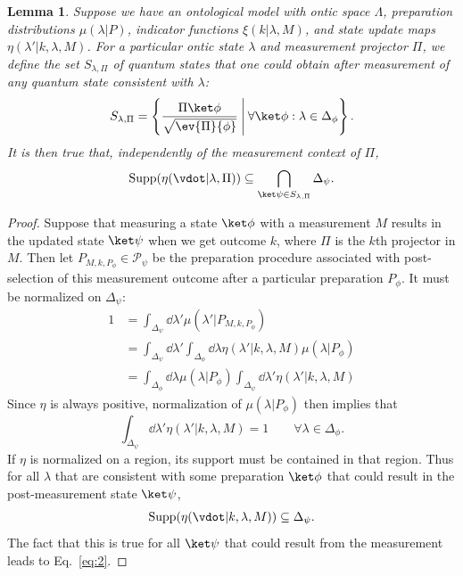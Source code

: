 \documentclass[%
 reprint,
superscriptaddress,
nofootinbib,
 amsmath,amssymb,
 prx, 
 accepted=2019-09-27,
]{quantumarticle}
\newtheorem{lemma}{Lemma}
\newcommand{\supp}{\textup{Supp}}
\begin{document}
\begin{lemma}
  \label{lem:littlelemma}
  Suppose we have an ontological model with ontic space $\Lambda$,
  preparation distributions $\mu(\lambda|P)$, indicator functions
  $\xi(k|\lambda,M)$, and state update maps
  $\eta(\lambda'|k,\lambda,M)$. For a particular ontic state $\lambda$
  and measurement projector $\Pi$, we define the set $S_{\lambda,\Pi}$
  of quantum states that one could obtain after measurement of any
  quantum state consistent with $\lambda$:
  \begin{equation}
    \label{eq:32}
    S_{\lambda,\Pi}=\left\{\frac{\Pi\ket\phi}{\sqrt{\ev{\Pi}{\phi}}}\:\middle|\:\forall\ket\phi:\lambda\in\Delta_\phi\right\}.
  \end{equation}
  It is then true that, independently of the measurement context of
  $\Pi$,
  \begin{equation}
    \label{eq:2}
    \supp(\eta(\vdot|\lambda,\Pi)) \subseteq \bigcap_{\ket\psi\in S_{\lambda,\Pi}}\Delta_\psi.
  \end{equation}
\end{lemma}
\begin{proof}
  Suppose that measuring a state $\ket\phi$ with a measurement $M$
  results in the updated state $\ket\psi$ when we get outcome $k$,
  where $\Pi$ is the $k$th projector in $M$. Then let
  $P_{M,k,P_\phi}\in\mathcal P_\psi$ be the preparation procedure
  associated with post-selection of this measurement outcome after a
  particular preparation $P_\phi$. It must be normalized on
  $\Delta_\psi$:
  \begin{align}
    1 &= \int_{\Delta_\psi}\dd{\lambda'}\mu(\lambda'|P_{M,k,P_\phi})\nonumber\\
      &= \int_{\Delta_\psi}\dd{\lambda'}\int_{\Delta_\phi}\dd{\lambda}\eta(\lambda'|k,\lambda,M)\mu(\lambda|P_\phi)\nonumber\\
      &= \int_{\Delta_\phi}\dd{\lambda}\mu(\lambda|P_\phi)\int_{\Delta_\psi}\dd{\lambda'}\eta(\lambda'|k,\lambda,M)\nonumber
  \end{align}
  Since $\eta$ is always positive, normalization of
  $\mu(\lambda|P_\phi)$ then implies that
  \begin{equation}
    \label{eq:6}
    \int_{\Delta_\psi}\dd{\lambda'}\eta(\lambda'|k,\lambda,M) = 1 \qquad\forall\lambda\in\Delta_{\phi}.\nonumber
  \end{equation}
  If $\eta$ is normalized on a region, its support must be contained
  in that region. Thus for all $\lambda$ that are consistent with some
  preparation $\ket\phi$ that could result in the post-measurement
  state $\ket\psi$,
  \begin{equation}
    \label{eq:7}
    \supp(\eta(\vdot|k,\lambda,M)) \subseteq \Delta_\psi.\nonumber
  \end{equation}
  The fact that this is true for all $\ket\psi$ that could result from the
  measurement leads to Eq.~\ref{eq:2}.
\end{proof}
 
\end{document}
